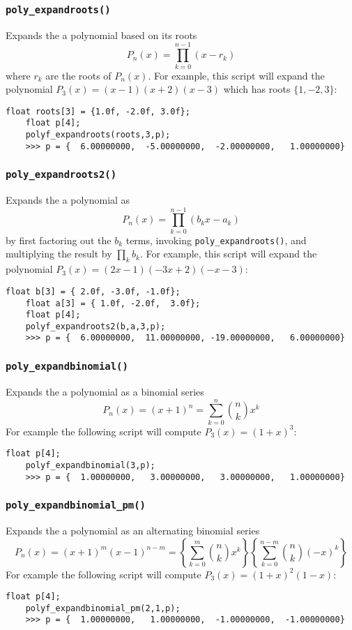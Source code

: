 \subsubsection{{\tt poly\_expandroots()}}
\label{module:math:poly:polyf_expandroots}
Expands the a polynomial based on its roots
\[
    P_n(x) = \prod_{k=0}^{n-1}{(x - r_k)}
\]
where $r_k$ are the roots of $P_n(x)$.
For example, this script will expand the polynomial
$P_3(x) = (x-1)(x+2)(x-3)$ which has roots
$\{1,-2,3\}$:
%
\begin{Verbatim}[fontsize=\small]
    float roots[3] = {1.0f, -2.0f, 3.0f};
    float p[4];
    polyf_expandroots(roots,3,p);
    >>> p = {  6.00000000,  -5.00000000,  -2.00000000,   1.00000000}
\end{Verbatim}
%

\subsubsection{{\tt poly\_expandroots2()}}
\label{module:math:poly:polyf_expandroots2}
Expands the a polynomial as
\[
    P_n(x) = \prod_{k=0}^{n-1}{(b_kx-a_k)}
\]
by first factoring out the $b_k$ terms,
invoking {\tt poly\_expandroots()}, and
multiplying the result by $\prod_k{b_k}$.
For example, this script will expand the polynomial
$P_3(x) = (2x-1)(-3x+2)(-x-3)$:
%
\begin{Verbatim}[fontsize=\small]
    float b[3] = { 2.0f, -3.0f, -1.0f};
    float a[3] = { 1.0f, -2.0f,  3.0f};
    float p[4];
    polyf_expandroots2(b,a,3,p);
    >>> p = {  6.00000000,  11.00000000, -19.00000000,   6.00000000}
\end{Verbatim}
%

\subsubsection{{\tt poly\_expandbinomial()}}
\label{module:math:poly:polyf_expandbinomial}
Expands the a polynomial as a binomial series
\[
    P_n(x) = (x+1)^n = \sum_{k=0}^{n}{ {n \choose k} x^k}
\]
For example the following script will compute
$P_3(x) = (1+x)^3$:
%
\begin{Verbatim}[fontsize=\small]
    float p[4];
    polyf_expandbinomial(3,p);
    >>> p = {  1.00000000,   3.00000000,   3.00000000,   1.00000000}
\end{Verbatim}
%

\subsubsection{{\tt poly\_expandbinomial\_pm()}}
\label{module:math:poly:polyf_expandbinomial_pm}
Expands the a polynomial as an alternating binomial series
\[
    P_n(x) = (x+1)^m (x-1)^{n-m}
           = \left\{ \sum_{k=0}^{m}  { {n \choose k}    x^k} \right\}
             \left\{ \sum_{k=0}^{n-m}{ {n \choose k} (-x)^k} \right\}
\]
For example the following script will compute
$P_3(x) = (1+x)^2(1-x)$:
%
\begin{Verbatim}[fontsize=\small]
    float p[4];
    polyf_expandbinomial_pm(2,1,p);
    >>> p = {  1.00000000,   1.00000000,  -1.00000000,  -1.00000000}
\end{Verbatim}
%


